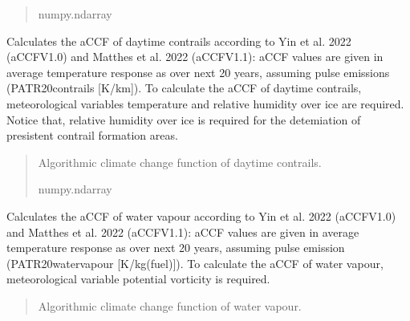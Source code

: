 \documentclass[a4paper,11pt,english]{sphinxmanual}
\begin{document}
\begin{fulllineitems}
\begin{fulllineitems}
\begin{quote}
\begin{description}
\sphinxAtStartPar
numpy.ndarray

\end{description}\end{quote}

\end{fulllineitems}


\begin{fulllineitems}
\label{\detokenize{modules:climaccf.accf.GeTaCCFs.accf_dcontrail}}
\pysigstartsignatures
{}
\pysigstopsignatures
\sphinxAtStartPar
Calculates the aCCF of day\sphinxhyphen{}time contrails according to Yin et al. 2022 (aCCF\sphinxhyphen{}V1.0) and Matthes et al. 2022 (aCCF\sphinxhyphen{}V1.1): aCCF values are  given in average 
temperature response as over next 20 years, assuming pulse emissions (P\sphinxhyphen{}ATR20\sphinxhyphen{}contrails {[}K/km{]}). To calculate the aCCF of day\sphinxhyphen{}time contrails,
meteorological variables temperature and relative humidity over ice are required. Notice that,
relative humidity over ice is required for the detemiation of presistent contrail formation areas.
\begin{quote}\begin{description}
\sphinxAtStartPar
Algorithmic climate change function of day\sphinxhyphen{}time contrails.

\sphinxAtStartPar
numpy.ndarray

\end{description}\end{quote}

\end{fulllineitems}


\begin{fulllineitems}
\label{\detokenize{modules:climaccf.accf.GeTaCCFs.accf_h2o}}
\pysigstartsignatures
{}
\pysigstopsignatures
\sphinxAtStartPar
Calculates the aCCF of water vapour according to Yin et al. 2022 (aCCF\sphinxhyphen{}V1.0) and Matthes et al. 2022 (aCCF\sphinxhyphen{}V1.1): aCCF values are  given in average 
temperature response as over next 20 years, assuming pulse emission (P\sphinxhyphen{}ATR20\sphinxhyphen{}water\sphinxhyphen{}vapour {[}K/kg(fuel){]}). To calculate the aCCF of water vapour,
meteorological variable potential vorticity is required.
\begin{quote}\begin{description}
\sphinxAtStartPar
Algorithmic climate change function of water vapour.


\end{description}
\end{quote}
\end{fulllineitems}
\end{fulllineitems}
\end{document}
